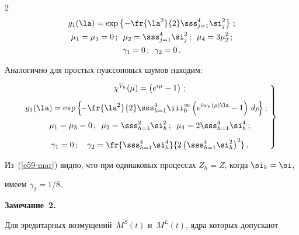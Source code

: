 \begin{multicols}{2}
\begin{gather*}
    g_1(\la) =\exp\left\{ -\fr{\la^2}{2} \sss_{j=1}^4 \si_j^2\right\}\,;\\


    \mu_1 =\mu_3 =0\,;\enskip \mu_2 = \sss_{j=1}^4 \si_j^2\,;\enskip \mu_4 = 3 \mu_2^2\,;\\


    \gamma_1=0\,;\enskip\gamma_2 =0\,.


\end{gather*}


Аналогично для простых пуассоновых шумов находим:


\begin{equation}


\left.


\begin{array}{c}


    \chi^{V_h} (\mu) =\left( e^{i\mu}-1\right)\,;\\[9pt]


\!\!\!\!\!    g_1(\la) =\exp\left\{\! -\fr{\la^2}{2}\displaystyle


    \sss_{h=1}^4 \iii_0^\infty \left( e^{iw_h (\rho) \la} -1\right)\, d\rho\!\right\};\\[9pt]


    \mu_1 =\mu_3 =0\,;\enskip \mu_2= \displaystyle\sss_{h=1}^2 \si_h^2\,;\enskip 


    \mu_4 = 2\sss_{h=1}^4 \si_h^4\,;\\[9pt]


    \gamma_1 =0\,;\quad \gamma_2 =\displaystyle


    \fr{\sss_{h=1}^4 \si_h^4}{ 2\left( \sss_{h=1}^4 \si^2_h\right)^2}\,.


    \end{array}\!


    \right\}\!


    \label{e59-mar}


    \end{equation}


Из~(\ref{e59-mar}) видно, что при одинаковых процессах $Z_h=Z$, когда $\si_h=\si$, 


имеем $\gamma_2 =1/8$.





\smallskip





\noindent


\textbf{Замечание~2.}


Для эредитарных возмущений~$M^S(t)$ и~$M^L(t)$, ядра которых допускают 



\end{multicols}
